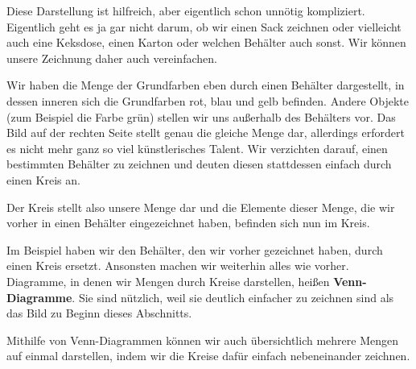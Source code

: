 \documentclass[../../main.tex]{subfiles}
\begin{document}
Diese Darstellung ist hilfreich, aber eigentlich schon unnötig kompliziert. Eigentlich geht es ja gar nicht darum, ob wir einen Sack zeichnen oder vielleicht auch eine Keksdose, einen Karton oder welchen Behälter auch sonst. Wir können unsere Zeichnung daher auch vereinfachen.
\begin{example}{}
    Wir haben die Menge der Grundfarben eben durch einen Behälter dargestellt, in dessen inneren sich die Grundfarben rot, blau und gelb befinden. Andere Objekte (zum Beispiel die Farbe grün) stellen wir uns außerhalb des Behälters vor.
    Das Bild auf der rechten Seite stellt genau die gleiche Menge dar, allerdings erfordert es nicht mehr ganz so viel künstlerisches Talent. Wir verzichten darauf, einen bestimmten Behälter zu zeichnen und deuten diesen stattdessen einfach durch einen Kreis an.

    Der Kreis stellt also unsere Menge dar und die Elemente dieser Menge, die wir vorher in einen Behälter eingezeichnet haben, befinden sich nun im Kreis.
\end{example}

Im Beispiel haben wir den Behälter, den wir vorher gezeichnet haben, durch einen Kreis ersetzt. Ansonsten machen wir weiterhin alles wie vorher. Diagramme, in denen wir Mengen durch Kreise darstellen, heißen \textbf{Venn-Diagramme}. Sie sind nützlich, weil sie deutlich einfacher zu zeichnen sind als das Bild zu Beginn dieses Abschnitts.

Mithilfe von Venn-Diagrammen können wir auch übersichtlich mehrere Mengen auf einmal darstellen, indem wir die Kreise dafür einfach nebeneinander zeichnen.
\end{document}
